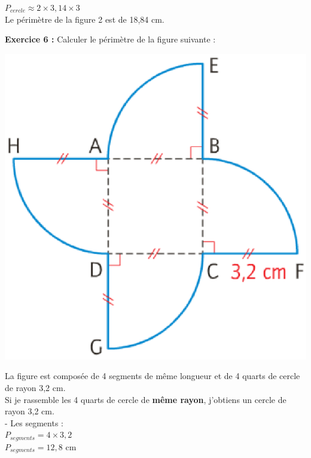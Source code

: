 \documentclass[a4paper,11pt]{article}
\begin{document}
$P_{cercle} \approx 2 \times 3,14 \times 3 $\\

 \hspace*{1cm} Le périmètre de la figure 2 est de 18,84 cm.\\


\color{black}

\textbf{Exercice 6 :} Calculer le périmètre de la figure suivante :

\begin{center}
\includegraphics[scale=0.6]{fig6.eps} 
\end{center}

\color{red}

La figure est composée de 4 segments de même longueur et de 4 quarts de cercle de rayon 3,2 cm.\\
Si je rassemble les 4 quarts de cercle de \textbf{même rayon}, j'obtiens un cercle de rayon 3,2 cm.\\


- Les segments :\\

$P_{segments} = 4 \times 3,2$\\

$P_{segments} = 12,8 $ cm\\
\end{document}
